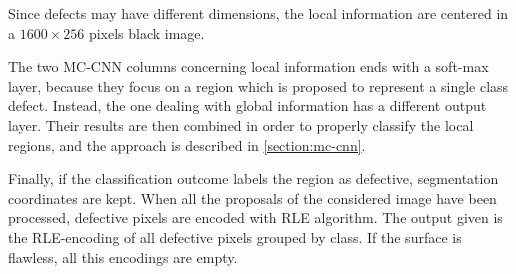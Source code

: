     \par{
        Since defects may have different dimensions, the local information are centered in a $1600\times 256$ pixels black image.
    }
    \par{
        The two MC-CNN columns concerning local information ends with a soft-max layer, because they focus on a region which is proposed to represent a single class defect. Instead, the one dealing with global information has a different output layer. Their results are then combined in order to properly classify the local regions, and the approach is described in \ref{section:mc-cnn}.
    }
    \par{
        Finally, if the classification outcome labels the region as defective, segmentation coordinates are kept. When all the proposals of the considered image have been processed, defective pixels are encoded with RLE algorithm. The output given is the RLE-encoding of all defective pixels grouped by class. If the surface is flawless, all this encodings are empty.
    }